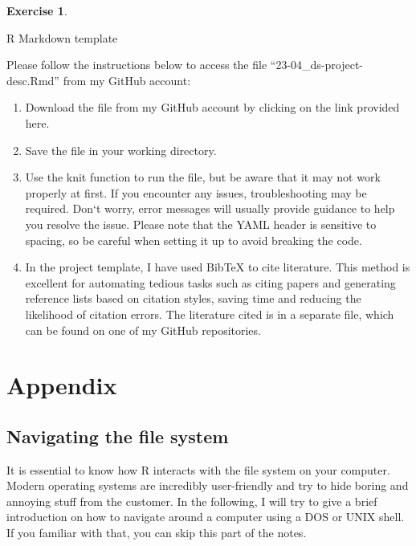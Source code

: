 \documentclass[
  12pt,
  oneside]{book}
\providecommand{\tightlist}{%
  \setlength{\itemsep}{0pt}\setlength{\parskip}{0pt}}
\theoremstyle{definition}
\theoremstyle{definition}
\theoremstyle{definition}
\newtheorem{exercise}{Exercise}[chapter]
\theoremstyle{definition}
\theoremstyle{remark}
\begin{document}
\begin{exercise}
\protect\hypertarget{exr:rmdsecond}{}\label{exr:rmdsecond}

R Markdown template

Please follow the instructions below to access the file ``23-04\_ds-project-desc.Rmd'' from my GitHub account:

\begin{enumerate}
\def\labelenumi{\arabic{enumi}.}
\tightlist
\item
  Download the file from my GitHub account by clicking on the link provided here.
\item
  Save the file in your working directory.
\item
  Use the knit function to run the file, but be aware that it may not work properly at first. If you encounter any issues, troubleshooting may be required. Don`t worry, error messages will usually provide guidance to help you resolve the issue. Please note that the YAML header is sensitive to spacing, so be careful when setting it up to avoid breaking the code.
\item
  In the project template, I have used BibTeX to cite literature. This method is excellent for automating tedious tasks such as citing papers and generating reference lists based on citation styles, saving time and reducing the likelihood of citation errors. The literature cited is in a separate file, which can be found on one of my GitHub repositories.
\end{enumerate}

\end{exercise}

\hypertarget{appendix}{%
\chapter{Appendix}\label{appendix}}

\hypertarget{sec:navigation}{%
\section{Navigating the file system}\label{sec:navigation}}

It is essential to know how R interacts with the file system on your computer. Modern operating systems are incredibly user-friendly and try to hide boring and annoying stuff from the customer. In the following, I will try to give a brief introduction on how to navigate around a computer using a DOS or UNIX shell. If you familiar with that, you can skip this part of the notes.
\end{document}

